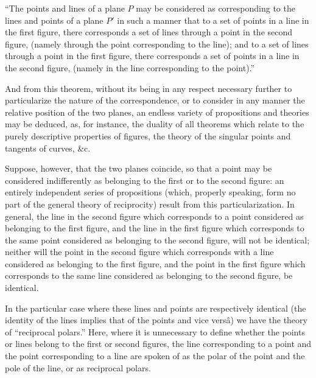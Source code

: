 \documentclass[11pt]{article}
\begin{document}
\smallskip
``The points and lines of a plane $P$ may be considered as corresponding to the
lines and points of a plane $P'$ in such a manner that to a set of points in a line
in the first figure, there corresponds a set of lines through a point in the second
figure, (namely through the point corresponding to the line); and to a set of lines
through a point in the first figure, there corresponds a set of points in a line in the
second figure, (namely in the line corresponding to the point).''

\smallskip
And from this theorem, without its being in any respect necessary further to
particularize the nature of the correspondence, or to consider in any manner the relative
position of the two planes, an endless variety of propositions and theories may be
deduced, as, for instance, the duality of all theorems which relate to the purely
descriptive properties of figures, the theory of the singular points and tangents of
curves, \&c.

\medskip
Suppose, however, that the two planes coincide, so that a point may be considered
indifferently as belonging to the first or to the second figure: an entirely independent
series of propositions (which, properly speaking, form no part of the general theory of
reciprocity) result from this particularization. In general, the line in the second figure
which corresponds to a point considered as belonging to the first figure, and the line
in the first figure which corresponds to the same point considered as belonging to the
second figure, will not be identical; neither will the point in the second figure which
corresponds with a line considered as belonging to the first figure, and the point in
the first figure which corresponds to the same line considered as belonging to the
second figure, be identical.

\bigskip

In the particular case where these lines and points are respectively identical (the
identity of the lines implies that of the points and vice vers\^a) we have the theory of
``reciprocal polars.'' Here, where it is unnecessary to define whether the points or
lines belong to the first or second figures, the line corresponding to a point and the
point corresponding to a line are spoken of as the polar of the point and the pole of
the line, or as reciprocal polars.
\end{document}
